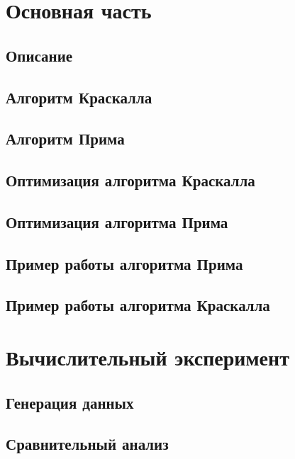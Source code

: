 	\section{Основная часть}
	
	\subsection{Описание}
	
	\subsection{Алгоритм Краскалла}
	
	\subsection{Алгоритм Прима}
	
	\subsection{Оптимизация алгоритма Краскалла}
	
	\subsection{Оптимизация алгоритма Прима}
	
	\subsection{Пример работы алгоритма Прима}
	
	\subsection{Пример работы алгоритма Краскалла}
	
	\section{Вычислительный эксперимент}
	
	\subsection{Генерация данных}
	
	\subsection{Сравнительный анализ}
	

